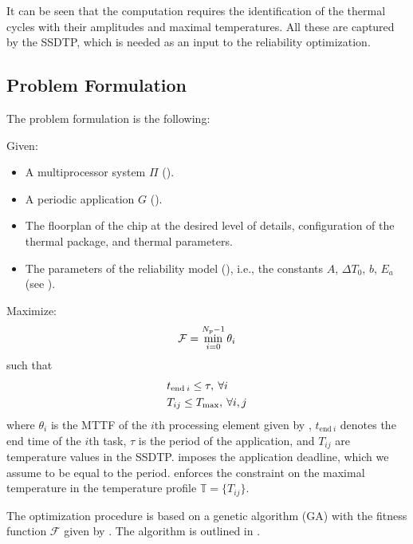 It can be seen that the computation requires the identification of the thermal
cycles with their amplitudes and maximal temperatures. All these are captured by
the SSDTP, which is needed as an input to the reliability optimization.

\subsection{Problem Formulation}

The problem formulation is the following:

Given:
\begin{itemize}

\item A multiprocessor system $\Pi$ ().

\item A periodic application $G$ ().

\item The floorplan of the chip at the desired level of details, configuration
of the thermal package, and thermal parameters.

\item The parameters of the reliability model (), i.e.,
the constants $A$, $\Delta T_0$, $b$, $E_a$ (see ).

\end{itemize}

Maximize:
\begin{equation} \elab{fitness-function}
  \mathcal{F} = \min_{i = 0}^{N_p - 1} \theta_i
\end{equation}
such that
\begin{align}
  & t_{\text{end} \: i} \leq \tau, \: \forall i \elab{deadline} \\
  & T_{ij} \leq T_\text{max}, \: \forall i, j \elab{t-max}
\end{align}
where $\theta_i$ is the MTTF of the $i$th processing element given by
, $t_{\text{end} \: i}$ denotes the end time of the $i$th task,
$\tau$ is the period of the application, and $T_{ij}$ are temperature values in
the SSDTP.  imposes the application deadline, which we assume to
be equal to the period.  enforces the constraint on the maximal
temperature in the temperature profile $\mathbb{T} = \{ T_{ij} \}$.

The optimization procedure is based on a genetic algorithm (GA)
\cite{schmitz2004} with the fitness function $\mathcal{F}$ given by
. The algorithm is outlined in .

